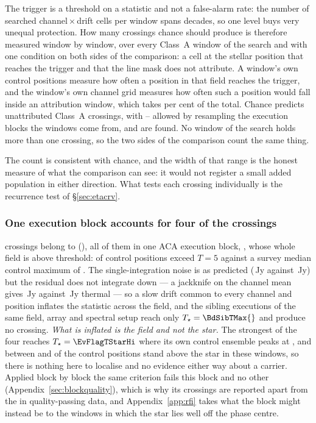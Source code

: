 The trigger is a threshold on a statistic and not a false-alarm rate: the
number of searched channel\,$\times$\,drift cells per window spans
\TuCellsDecades{} decades, so one level buys very unequal protection. How
many crossings chance should produce is therefore measured window by window,
over every Class~A window of the search and with one condition on both sides
of the comparison: a cell at the stellar position that reaches the trigger
and that the line mask does not attribute. A window's own \NCtrl{} control
positions measure how often a position in that field reaches the trigger, and
the window's own channel grid measures how often such a position would fall
inside an attribution window, which takes \CeMaskPct{} per cent of the total.
Chance predicts \CeExp{} unattributed Class~A crossings, with
\CeLo--\CeHi{} allowed by resampling the execution blocks the windows come
from, and \CeObs{} are found. No window of the search holds more than one
crossing, so the two sides of the comparison count the same thing.

The count is consistent with chance, and the width of that range is the
honest measure of what the comparison can see: it would not register a small
added population in either direction. What tests each crossing
individually is the recurrence test of \S\ref{sec:etacrv}.

\subsubsection{One execution block accounts for four of the crossings}
\label{sec:bdblock}

\BdNCross{} crossings belong to \BdStar{} (\BdAlias), all of them in one ACA
execution block, \texttt{\BdBlock}, whose whole field is above
threshold: \BdNCtrlAbove{} of \BdNCtrl{} control positions exceed $T=5$
against a survey median control maximum of \BdSurvCtrlMed. The
single-integration noise is as predicted (\BdRmsMeas\,Jy against
\BdRmsPred\,Jy) but the residual does not integrate down --- a jackknife on
the channel mean gives \BdJack\,Jy against \BdThermal\,Jy thermal --- so a
slow drift common to every channel and position inflates the statistic across
the field, and the \BdNSibling{} sibling executions of the same field, array
and spectral setup reach only $T_\star=\BdSibTMax{}$ and produce no crossing.
\emph{What is inflated is the field and not the star.} The strongest of the
four reaches $T_\star=\EvFlagTStarHi$ where its own control ensemble peaks at
\EvFlagCtrlAtHi, and between \EvFlagNgeLo{} and \EvFlagNgeHi{} of the
\BdNCtrl{} control positions stand above the star in these windows, so there
is nothing here to localise and no evidence either way about a carrier.
Applied block by block the same criterion fails this block and no other
(Appendix~\ref{sec:blockquality}), which is why its \BdNCross{} crossings are
reported apart from the \EvNCrossQp{} in quality-passing data, and
Appendix~\ref{app:rfi} takes what the block might instead be to the windows
in which the star lies well off the phase centre.

